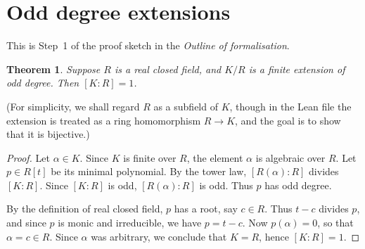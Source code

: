 \documentclass{article}
\newtheorem{theorem}{Theorem}
\begin{document}
\section*{Odd degree extensions}
This is Step~1 of the proof sketch in the \emph{Outline of formalisation}.
\begin{theorem}\label{thm:odd-degree-extensions}
Suppose $R$ is a real closed field, and $K/R$ is a finite extension of
odd degree. Then $[K:R]=1$.
\end{theorem}
(For simplicity, we shall regard $R$ as a subfield of $K$, though in the Lean
file the extension is treated as a ring homomorphism $R\to K$, and the goal is
to show that it is bijective.)
\begin{proof}
Let $\alpha\in K$. Since $K$ is finite over $R$, the element $\alpha$
is algebraic over $R$. Let $p\in R[t]$ be its minimal polynomial. By the tower
law, $[R(\alpha):R]$ divides $[K:R]$. Since $[K:R]$ is odd, $[R(\alpha):R]$ is
odd. Thus $p$ has odd degree.

By the definition of real closed field, $p$ has a root, say $c\in R$. Thus $t-c$
divides $p$, and since $p$ is monic and irreducible, we have $p=t-c$. Now 
$p(\alpha)=0$, so that $\alpha=c\in R$. Since $\alpha$ was arbitrary,
we conclude that $K=R$, hence $[K:R]=1$.
\end{proof}
\end{document}
